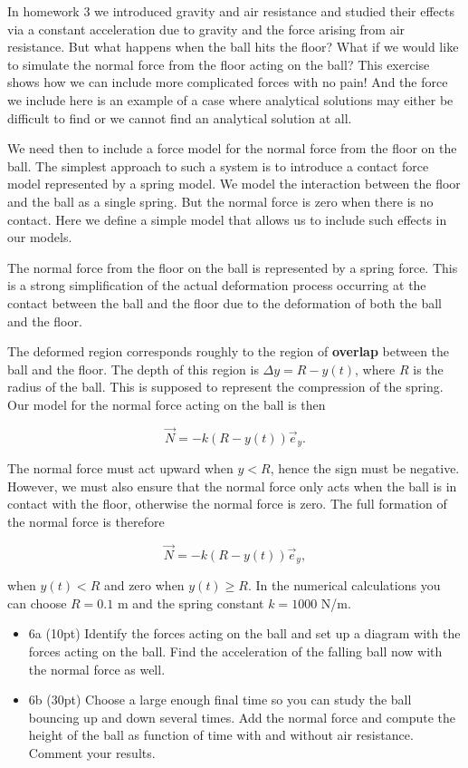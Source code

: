\documentclass[11pt]{article}
\begin{document}
In homework 3 we introduced gravity and air resistance and studied their
effects via a constant acceleration due to gravity and the force arising
from air resistance. But what happens when the ball hits the floor? What
if we would like to simulate the normal force from the floor acting on
the ball? This exercise shows how we can include more complicated forces
with no pain! And the force we include here is an example of a case
where analytical solutions may either be difficult to find or we cannot
find an analytical solution at all.

We need then to include a force model for the normal force from the
floor on the ball. The simplest approach to such a system is to
introduce a contact force model represented by a spring model. We model
the interaction between the floor and the ball as a single spring. But
the normal force is zero when there is no contact. Here we define a
simple model that allows us to include such effects in our models.

The normal force from the floor on the ball is represented by a spring
force. This is a strong simplification of the actual deformation process
occurring at the contact between the ball and the floor due to the
deformation of both the ball and the floor.

The deformed region corresponds roughly to the region of
\textbf{overlap} between the ball and the floor. The depth of this
region is \(\Delta y = R-y(t)\), where \(R\) is the radius of the ball.
This is supposed to represent the compression of the spring. Our model
for the normal force acting on the ball is then

    \[
\vec{N} = -k (R-y(t)) \vec{e}_y.
\]

    The normal force must act upward when \(y < R\), hence the sign must be
negative. However, we must also ensure that the normal force only acts
when the ball is in contact with the floor, otherwise the normal force
is zero. The full formation of the normal force is therefore

    \[
\vec{N} = -k (R-y(t)) \vec{e}_y,
\]

    when \(y(t) < R\) and zero when \(y(t) \ge R\). In the numerical
calculations you can choose \(R=0.1\) m and the spring constant
\(k=1000\) N/m.

\begin{itemize}
\item
  6a (10pt) Identify the forces acting on the ball and set up a diagram
  with the forces acting on the ball. Find the acceleration of the
  falling ball now with the normal force as well.
\item
  6b (30pt) Choose a large enough final time so you can study the ball
  bouncing up and down several times. Add the normal force and compute
  the height of the ball as function of time with and without air
  resistance. Comment your results.
\end{itemize}
\end{document}
